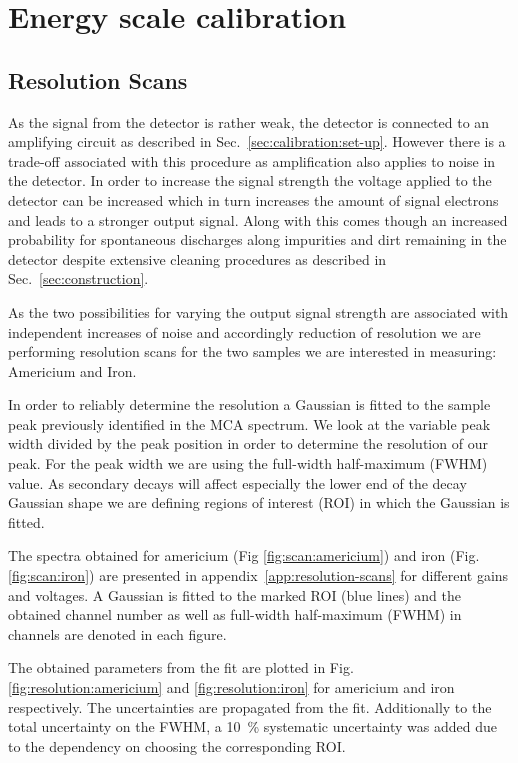 \section{Energy scale calibration}
\label{sec:energy_scan}

\subsection{Resolution Scans}
\label{sec:resolution_scans}
As the signal from the detector is rather weak, the detector is connected to an
amplifying circuit as described in Sec.~\ref{sec:calibration:set-up}. However
there is a trade-off associated with this procedure as amplification also
applies to noise in the detector. In order to increase the signal strength the
voltage applied to the detector can be increased which in turn increases the
amount of signal electrons and leads to a stronger output signal. Along with
this comes though an increased probability for spontaneous discharges along
impurities and dirt remaining in the detector despite extensive cleaning
procedures as described in Sec.~\ref{sec:construction}.

As the two possibilities for varying the output signal strength are associated
with independent increases of noise and accordingly reduction of resolution we
are performing resolution scans for the two samples we are interested in
measuring: Americium and Iron.

In order to reliably determine the resolution a Gaussian is fitted to the sample
peak previously identified in the MCA spectrum. We look
at the variable peak width divided by the peak position in order to determine
the resolution of our peak. For the peak width we are using the full-width
half-maximum (FWHM) value. As secondary decays will affect especially the lower
end of the decay Gaussian  shape we are defining regions of interest (ROI) in which the Gaussian
is fitted.

The spectra obtained for americium (Fig \ref{fig:scan:americium}) and iron
(Fig. \ref{fig:scan:iron}) are presented in appendix~\ref{app:resolution-scans} for different gains and voltages.
A Gaussian is fitted to the marked ROI (blue lines) and the obtained channel number as well as
full-width half-maximum (FWHM) in channels are denoted in each figure.

The obtained parameters from the fit are plotted in Fig.
\ref{fig:resolution:americium} and \ref{fig:resolution:iron} for americium and
iron respectively. The uncertainties are propagated from the fit. Additionally to the
total uncertainty on the FWHM, a \SI{10}{\percent} systematic
uncertainty was added due to the dependency on choosing the corresponding ROI.

